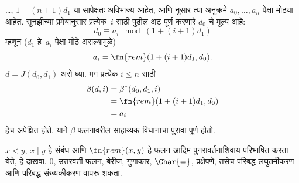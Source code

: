 \documentclass[../../../include/open-logic-section]{subfiles}
\begin{document}
\dots, $1+(n+1) d_1$ या सापेक्षतः अविभाज्य आहेत,
आणि  नुसार त्या अनुक्रमे
$a_0,\dots,a_n$ पेक्षा मोठ्या आहेत. सुनझीच्या प्रमेयानुसार
प्रत्येक~$i$ साठी पुढील अट पूर्ण करणारे $d_0$ चे मूल्य आहे:
\[
d_0 \equiv a_i \mod (1+(i+1)d_1)
\]
म्हणून ($d_1$ हे~$a_i$ पेक्षा मोठे असल्यामुळे)
\[
a_i = \fn{rem}(1+(i+1)d_1,d_0).
\]
$d = J(d_0,d_1)$ असे घ्या. मग प्रत्येक $i \le n$ साठी
\begin{align*}
\beta(d,i) & =  \beta^*(d_0,d_1,i) \\
& =  \fn{rem}(1+(i+1) d_1,d_0) \\
& =  a_i
\end{align*}
हेच अपेक्षित होते. याने $\beta$-फलनावरील साहाय्यक विधानाचा
पुरावा पूर्ण होतो.

\begin{prob}
  $x < y$, $x \mid y$ हे संबंध आणि $\fn{rem}(x,y)$ हे
  फलन आदिम पुनरावर्तनाशिवाय परिभाषित करता येते, हे दाखवा.
  $0$, उत्तरवर्ती फलन, बेरीज, गुणाकार, $\Char{=}$,
  प्रक्षेपणे, तसेच परिबद्ध लघुतमीकरण आणि परिबद्ध संख्यकीकरण
  वापरू शकता.
\end{prob}
\end{document}
